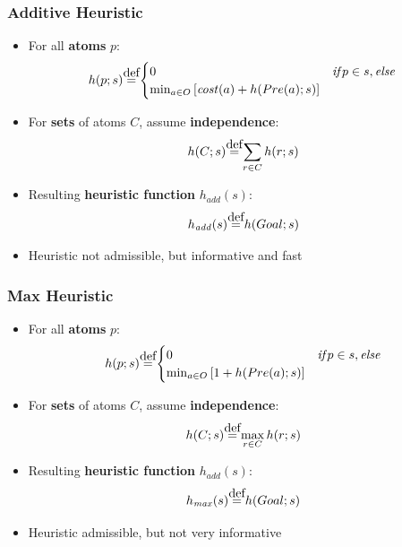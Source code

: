 \documentclass{beamer}
\newcommand\myeq{\stackrel{\mathclap{\normalfont\mbox{def}}}{=}}
\begin{document}
	\begin{frame}[c]\frametitle{Additive Heuristic}
		\begin{itemize}
			\item For all \textbf{atoms} $p$:
			$$h(p;s) \myeq \begin{cases}
							0 & \mathit{if} p \in s, \mathit{else} \\
							\min_{a \in O}\left[ \mathit{cost}(a) + h(Pre(a); s) \right]
							\end{cases}$$
			\item For \textbf{sets} of atoms $C$, assume \textbf{independence}:
			$$h(C;s) \myeq \sum_{r \in C} h(r; s)$$
			\item Resulting \textbf{heuristic function} $h_{add}(s)$:
			$$h_{\mathit{add}}(s) \myeq h(Goal; s)$$
			\item Heuristic not admissible, but informative and fast
		\end{itemize}
	\end{frame}
	
	\begin{frame}[c]\frametitle{Max Heuristic}
		\begin{itemize}
			\item For all \textbf{atoms} $p$:
			$$h(p;s) \myeq \begin{cases}
							0 & \mathit{if} p \in s, \mathit{else} \\
							\min_{a \in O}\left[ 1 + h(Pre(a); s) \right]
							\end{cases}$$
			\item For \textbf{sets} of atoms $C$, assume \textbf{independence}:
			$$h(C;s) \myeq \max_{r \in C} h(r; s)$$
			\item Resulting \textbf{heuristic function} $h_{add}(s)$:
			$$h_{\mathit{max}}(s) \myeq h(Goal; s)$$
			\item Heuristic admissible, but not very informative
		\end{itemize}
	\end{frame}
	
\end{document}
